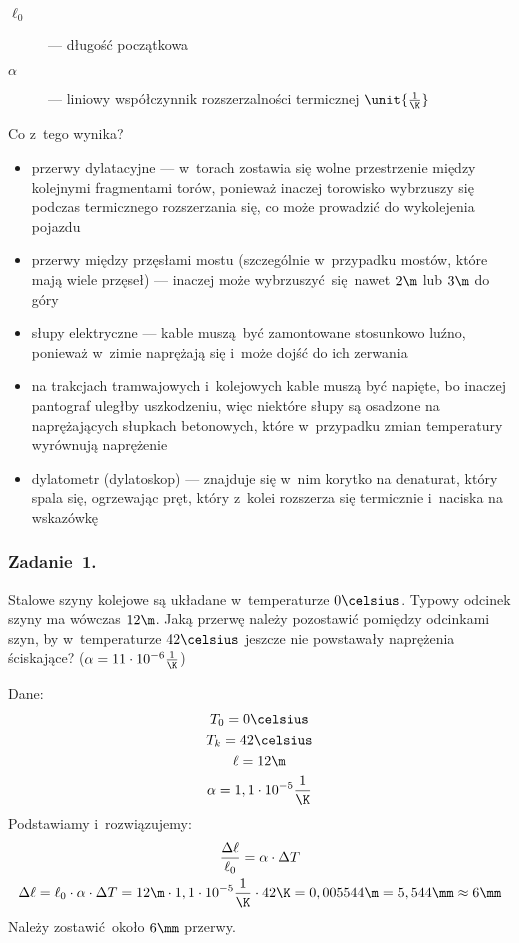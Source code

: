 \begin{description}
    \item[\(\ell_0\)] --- długość początkowa
    \item[\(\alpha\)] --- liniowy współczynnik rozszerzalności termicznej \(\unit{\frac{1}{\K}}\)
\end{description}
Co z~tego wynika?
\begin{itemize}
    \item przerwy dylatacyjne --- w~torach zostawia się wolne przestrzenie między kolejnymi fragmentami torów, ponieważ inaczej torowisko wybrzuszy się podczas termicznego rozszerzania się, co może prowadzić do wykolejenia pojazdu
    \item przerwy między przęsłami mostu (szczególnie w~przypadku mostów, które mają wiele przęseł) --- inaczej może wybrzuszyć się nawet \(2\m\) lub \(3\m\) do góry
    \item słupy elektryczne --- kable muszą być zamontowane stosunkowo luźno, ponieważ w~zimie naprężają się i~może dojść do ich zerwania
    \item na trakcjach tramwajowych i~kolejowych kable muszą być napięte, bo inaczej pantograf uległby uszkodzeniu, więc niektóre słupy są osadzone na naprężających słupkach betonowych, które w~przypadku zmian temperatury wyrównują naprężenie
    \item dylatometr (dylatoskop) --- znajduje się w~nim korytko na denaturat, który spala się, ogrzewając pręt, który z~kolei rozszerza się termicznie i~naciska na wskazówkę
\end{itemize}
\subsubsection*{Zadanie~1.}
\begin{statement}
    Stalowe szyny kolejowe są układane w~temperaturze \(0\celsius\). Typowy odcinek szyny ma wówczas \(12\m\). Jaką przerwę należy pozostawić pomiędzy odcinkami szyn, by w~temperaturze \(42\celsius\) jeszcze nie powstawały naprężenia ściskające? (\(\alpha = 11 \cdot 10^{-6}\frac{1}{\K}\))
\end{statement}
Dane:
\begin{gather*}
    T_0 = 0\celsius\\
    T_k = 42\celsius\\
    \ell = 12\m\\
    \alpha = 1,1 \cdot 10^{-5} \frac{1}{\K}
\end{gather*}
Podstawiamy i~rozwiązujemy:
\begin{gather*}
    \frac{\Delta \ell}{\ell_0} = \alpha \cdot \Delta T\\
    \Delta \ell = \ell_0 \cdot \alpha \cdot \Delta T = 12\m \cdot 1,1 \cdot 10^{-5} \frac{1}{\K} \cdot 42\K
        = 0,005544\m
        = 5,544\mm
        \approx 6\mm
\end{gather*}
Należy zostawić około \(6\mm\) przerwy.
